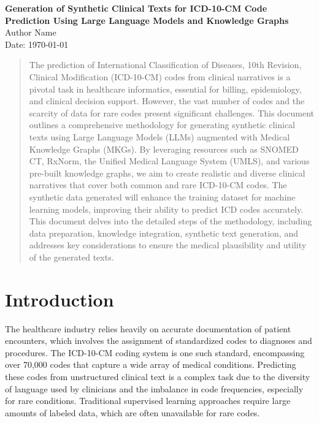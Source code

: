 \documentclass[12pt, a4paper]{article}
\begin{document}
\begin{center}
    {\Large \textbf{Generation of Synthetic Clinical Texts for ICD-10-CM Code Prediction Using Large Language Models and Knowledge Graphs}}\\[1.5cm]
    {\large Author Name}\\
    {\large Date: \today}
\end{center}

\vspace{1.5cm}

\begin{abstract}
The prediction of International Classification of Diseases, 10th Revision, Clinical Modification (ICD-10-CM) codes from clinical narratives is a pivotal task in healthcare informatics, essential for billing, epidemiology, and clinical decision support. However, the vast number of codes and the scarcity of data for rare codes present significant challenges. This document outlines a comprehensive methodology for generating synthetic clinical texts using Large Language Models (LLMs) augmented with Medical Knowledge Graphs (MKGs). By leveraging resources such as SNOMED CT, RxNorm, the Unified Medical Language System (UMLS), and various pre-built knowledge graphs, we aim to create realistic and diverse clinical narratives that cover both common and rare ICD-10-CM codes. The synthetic data generated will enhance the training dataset for machine learning models, improving their ability to predict ICD codes accurately. This document delves into the detailed steps of the methodology, including data preparation, knowledge integration, synthetic text generation, and addresses key considerations to ensure the medical plausibility and utility of the generated texts.
\end{abstract}

\newpage

\tableofcontents

\newpage

\section{Introduction}

The healthcare industry relies heavily on accurate documentation of patient encounters, which involves the assignment of standardized codes to diagnoses and procedures. The ICD-10-CM coding system is one such standard, encompassing over 70,000 codes that capture a wide array of medical conditions. Predicting these codes from unstructured clinical text is a complex task due to the diversity of language used by clinicians and the imbalance in code frequencies, especially for rare conditions. Traditional supervised learning approaches require large amounts of labeled data, which are often unavailable for rare codes.
\end{document}
